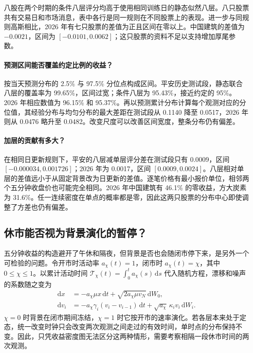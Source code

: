 \documentclass[11pt,a4paper]{article}
\begin{document}
八股在两个时期的条件八层评分均高于使用相同训练日的静态似然八层。八只股票共有交易日和市场消息，表中各行是同一规则在不同股票上的表现。进一步与同规则高斯相比，2026 年有七只股票的差值为正且区间在零以上。中国建筑的差值为 $-0.0021$，区间为 $[-0.0101,0.0062]$；这只股票的资料不足以支持增加厚尾参数。

\paragraph{预测区间能否覆盖约定比例的收益？}
按当天预测分布的 2.5\% 与 97.5\% 分位点构成区间。平安历史测试段，静态联合八层的覆盖率为 99.65\%，区间过宽；条件八层为 95.43\%，接近约定的 95\%。2026 年相应数值为 96.15\% 和 95.37\%。再以预测累计分布计算每个观测对应的分位值，其经验分布与均匀分布的最大差距在测试段从 0.1140 降至 0.0517，2026 年则从 0.0476 略升至 0.0482。改变尺度可以改善区间宽度，整条分布仍有偏差。

\paragraph{加层的贡献有多大？}
在相同日更新规则下，平安的八层减单层评分差在测试段只有 0.0009，区间 $[-0.000034,0.001726]$；2026 年为 0.0017，区间 $[0.0009,0.0024]$。八层相对单层的差值远小于从固定背景改为日更新的差值。逐笔价格有最小报价单位，相邻两个五分钟收盘价也可能完全相同。2026 年中国建筑有 46.1\% 的零收益，方大炭素为 31.6\%。任一连续密度在单点的概率都是零，因此这两只股票的分布中心即使调整了方差也仍有偏差。

\clearpage
\subsection{休市能否视为背景演化的暂停？}
五分钟收益的构造避开了午休和隔夜，但背景是否也会随闭市停下来，是另外一个可检验的问题。令开市时活动率 $a_\chi(t)=1$，闭市时 $a_\chi(t)=\chi$，其中 $0\leq\chi\leq1$。以累计活动时间 $\mathcal T_\chi(t)=\int_0^t a_\chi(s)\,\mathrm ds$ 代入随机方程，漂移和噪声的系数随之变为
\begin{align*}
 \mathrm dx&=-a_\chi\mu x\,\mathrm dt+\sqrt{2a_\chi\mu v_N}\,\mathrm dW_0,\\
 \mathrm dv_i&=-a_\chi\gamma_i(v_i-v_{i-1})\,\mathrm dt+\sqrt{a_\chi}\,\kappa_i v_i\,\mathrm dW_i.
\end{align*}
$\chi=0$ 时背景在闭市期间冻结，$\chi=1$ 时它按开市的速率演化。若各层本来处于定态，统一改变时钟只会改变两次观测之间走过的有效时间，单时点的分布保持不变。因此，只凭收益密度图无法区分这两种情形，需要考察相隔一段休市时间的两次观测。
\end{document}
